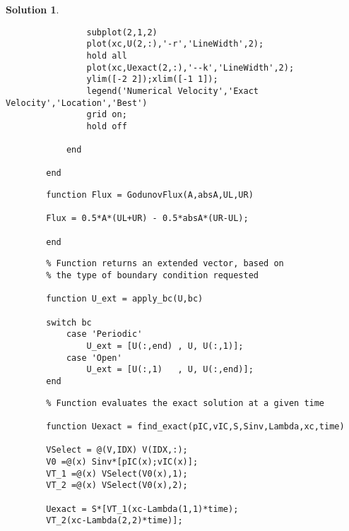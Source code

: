 \documentclass[10pt,letterpaper]{article}
\theoremstyle{break}
\newtheorem{mysolution}{Solution}
\newenvironment{solution}{\begin{mysolution}}{\end{mysolution}}
\begin{document}
\begin{solution}
\begin{enumerate}
\begin{lstlisting}
				subplot(2,1,2)
				plot(xc,U(2,:),'-r','LineWidth',2);
				hold all
				plot(xc,Uexact(2,:),'--k','LineWidth',2);
				ylim([-2 2]);xlim([-1 1]);
				legend('Numerical Velocity','Exact Velocity','Location','Best')
				grid on;
				hold off
				
			end
			
		end
	\end{lstlisting}

	
	\begin{lstlisting}
		function Flux = GodunovFlux(A,absA,UL,UR)

		Flux = 0.5*A*(UL+UR) - 0.5*absA*(UR-UL);

		end
	\end{lstlisting}

	\begin{lstlisting}
		% Function returns an extended vector, based on
		% the type of boundary condition requested

		function U_ext = apply_bc(U,bc)

		switch bc
			case 'Periodic'
				U_ext = [U(:,end) , U, U(:,1)];
			case 'Open'
				U_ext = [U(:,1)   , U, U(:,end)];
		end
	\end{lstlisting}
	
	\begin{lstlisting}
		% Function evaluates the exact solution at a given time

		function Uexact = find_exact(pIC,vIC,S,Sinv,Lambda,xc,time)

		VSelect = @(V,IDX) V(IDX,:);
		V0 =@(x) Sinv*[pIC(x);vIC(x)];
		VT_1 =@(x) VSelect(V0(x),1);
		VT_2 =@(x) VSelect(V0(x),2);

		Uexact = S*[VT_1(xc-Lambda(1,1)*time);
		VT_2(xc-Lambda(2,2)*time)];
	\end{lstlisting}
	

	\end{enumerate}
\end{solution}
	
\end{document}
